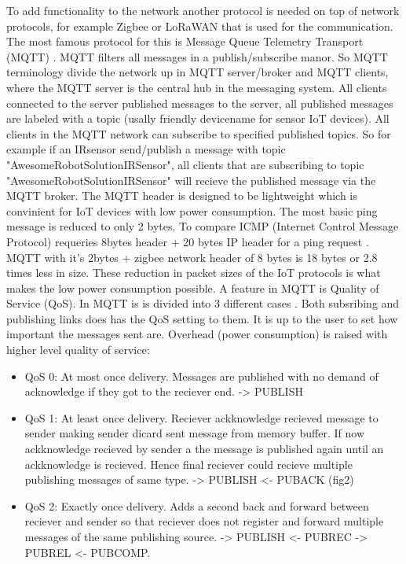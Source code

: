 \documentclass[article,a4paper]{IEEEtran}
\begin{document}
    \newline\newline
    To add functionality to the network another protocol is needed on top of network protocols, for example Zigbee or LoRaWAN that is used for the communication. The most famous protocol for this is Message Queue Telemetry Transport (MQTT) \cite{mqtt3.1.1,mqtt5.0}. MQTT filters all messages in a publish/subscribe manor. So MQTT terminology divide the network up in MQTT server/broker and MQTT clients, where the MQTT server is the central hub in the messaging system. All clients connected to the server published messages to the server, all published messages are labeled with a topic (usally friendly devicename for sensor IoT devices). All clients in the MQTT network can subscribe to specified published topics. So for example if an IRsensor send/publish a message with topic "AwesomeRobotSolutionIRSensor", all clients that are subscribing to topic "AwesomeRobotSolutionIRSensor" will recieve the published message via the MQTT broker. The MQTT header is designed to be lightweight which is convinient for IoT devices with low power consumption. The most basic ping message is reduced to only 2 bytes. To compare ICMP (Internet Control Message Protocol) requeries 8bytes header + 20 bytes IP header for a ping request \cite{ICMPping}. MQTT with it's 2bytes + zigbee network header of 8 bytes is 18 bytes or 2.8 times less in size. These reduction in packet sizes of the IoT protocols is what makes the low power consumption possible.
    \newline\newline
    A feature in MQTT is Quality of Service (QoS). In MQTT is is divided into 3 different cases \cite{mqtt3.1.1,mqtt5.0}. Both subsribing and publishing links does has the QoS setting to them. It is up to the user to set how important the messages sent are. Overhead (power consumption) is raised with higher level quality of service:
    \begin{itemize}
        \item QoS 0: At most once delivery. Messages are published with no demand of acknowledge if they got to the reciever end. -> PUBLISH
        \item QoS 1: At least once delivery. Reciever ackknowledge recieved message to sender making sender dicard sent message from memory buffer. If now ackknowledge recieved by sender a the message is published again until an ackknowledge is recieved. Hence final reciever could recieve multiple publishing messages of same type. -> PUBLISH <- PUBACK (fig2)
        \item QoS 2: Exactly once delivery. Adds a second back and forward between reciever and sender so that reciever does not register and forward multiple messages of the same publishing source. -> PUBLISH <- PUBREC -> PUBREL <- PUBCOMP.  
    \end{itemize}
\end{document}
